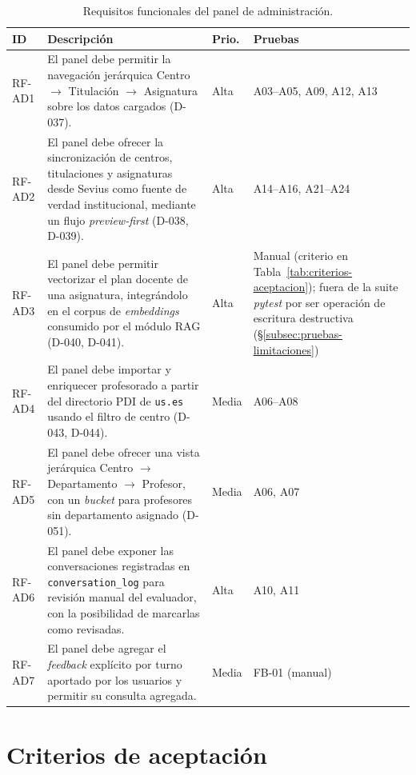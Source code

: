\begin{table}[hbtp]
\centering
\small
\caption{Requisitos funcionales del panel de administración.}\label{tab:rf-admin}
\begin{tabular}{|p{1.1cm}|p{7.3cm}|p{0.9cm}|p{2.2cm}|}
\hline
\textbf{ID} & \textbf{Descripción} & \textbf{Prio.} & \textbf{Pruebas} \\ \hline
RF-AD1 & El panel debe permitir la navegación jerárquica Centro $\rightarrow$ Titulación $\rightarrow$ Asignatura sobre los datos cargados (D-037). & Alta & A03--A05, A09, A12, A13 \\ \hline
RF-AD2 & El panel debe ofrecer la sincronización de centros, titulaciones y asignaturas desde Sevius como fuente de verdad institucional, mediante un flujo \textit{preview-first} (D-038, D-039). & Alta & A14--A16, A21--A24 \\ \hline
RF-AD3 & El panel debe permitir vectorizar el plan docente de una asignatura, integrándolo en el corpus de \textit{embeddings} consumido por el módulo RAG (D-040, D-041). & Alta & Manual (criterio en Tabla~\ref{tab:criterios-aceptacion}); fuera de la suite \textit{pytest} por ser operación de escritura destructiva (\S\ref{subsec:pruebas-limitaciones}) \\ \hline
RF-AD4 & El panel debe importar y enriquecer profesorado a partir del directorio PDI de \texttt{us.es} usando el filtro de centro (D-043, D-044). & Media & A06--A08 \\ \hline
RF-AD5 & El panel debe ofrecer una vista jerárquica Centro $\rightarrow$ Departamento $\rightarrow$ Profesor, con un \textit{bucket} para profesores sin departamento asignado (D-051). & Media & A06, A07 \\ \hline
RF-AD6 & El panel debe exponer las conversaciones registradas en \texttt{conversation\_log} para revisión manual del evaluador, con la posibilidad de marcarlas como revisadas. & Alta & A10, A11 \\ \hline
RF-AD7 & El panel debe agregar el \textit{feedback} explícito por turno aportado por los usuarios y permitir su consulta agregada. & Media & FB-01 (manual) \\ \hline
\end{tabular}
\end{table}

\section{Criterios de aceptación}\label{sec:req-aceptacion}

